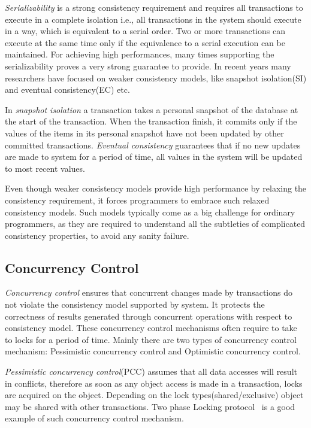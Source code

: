 \documentclass[12pt,english]{report}
\begin{document}
\textit{Serializability} is a strong consistency requirement and requires all transactions to execute in a complete isolation i.e., all transactions in the system should execute in a way, which is equivalent to a serial order. Two or more transactions can execute at the same time only if the equivalence to a serial execution can be maintained. For achieving high performances, many times supporting the serializability proves a very strong guarantee to provide. In recent years many researchers have focused on weaker consistency models, like snapshot isolation(SI) and eventual consistency(EC) etc.

In \textit{snapshot isolation} a transaction takes a personal snapshot of the database at the start of the transaction. When the transaction finish, it commits only if the values of the items in its personal snapshot have not been updated by other committed transactions. \textit{Eventual consistency} guarantees that if no new updates are made to system for a period of time, all values in the system will be updated to most recent values.

Even though weaker consistency models provide high performance by relaxing the consistency requirement, it forces programmers to embrace such relaxed consistency models. Such models typically come as a big challenge for ordinary programmers, as they are required to understand all the subtleties of complicated consistency properties, to avoid any sanity failure.

\subsection{Concurrency Control} 

\textit{Concurrency control} ensures that concurrent changes made by transactions do not violate the consistency model supported by system. It protects the correctness of results generated through concurrent operations with respect to consistency model. These concurrency control mechanisms often require to take to locks for a period of time. Mainly there are two types of concurrency control mechanism: Pessimistic concurrency control and Optimistic concurrency control.

\textit{Pessimistic concurrency control}(PCC) assumes that all data accesses will result in conflicts, therefore as soon as any object access is made in a transaction, locks are acquired on the object. Depending on the lock types(shared/exclusive) object may be shared with other transactions. Two phase Locking protocol~\cite{2PL:lin1983basic} is a good example of such concurrency control mechanism.  
\end{document}
